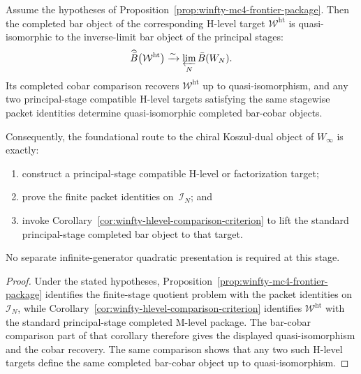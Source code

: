 \begin{corollary}
\label{cor:winfty-dual-candidate-construction}
Assume the hypotheses of
Proposition~\ref{prop:winfty-mc4-frontier-package}.  Then the completed
bar object of the corresponding H-level target
$\mathcal{W}^{\mathrm{ht}}$ is quasi-isomorphic to the inverse-limit
bar object of the principal stages:
\[
\widehat{\bar B}\bigl(\mathcal{W}^{\mathrm{ht}}\bigr)
\xrightarrow{\sim}
\varprojlim_N \bar B(W_N).
\]
Its completed cobar comparison recovers
$\mathcal{W}^{\mathrm{ht}}$ up to quasi-isomorphism, and any two
principal-stage compatible H-level targets satisfying the same
stagewise packet identities determine quasi-isomorphic completed
bar-cobar objects.

Consequently, the foundational route to the chiral Koszul-dual object
of \texorpdfstring{$W_\infty$}{W_infty} is exactly:
\begin{enumerate}
\item construct a principal-stage compatible H-level or factorization
  target;
\item prove the finite packet identities on~$\mathcal{I}_N$; and
\item invoke
  Corollary~\ref{cor:winfty-hlevel-comparison-criterion} to lift the
  standard principal-stage completed bar object to that target.
\end{enumerate}
No separate infinite-generator quadratic presentation is required at
this stage.
\end{corollary}

\begin{proof}
Under the stated hypotheses,
Proposition~\ref{prop:winfty-mc4-frontier-package} identifies the
finite-stage quotient problem with the packet identities on
$\mathcal{I}_N$, while
Corollary~\ref{cor:winfty-hlevel-comparison-criterion} identifies
$\mathcal{W}^{\mathrm{ht}}$ with the standard principal-stage completed
M-level package.  The bar-cobar comparison part of that corollary
therefore gives the displayed quasi-isomorphism and the cobar recovery.
The same comparison shows that any two such H-level targets define the
same completed bar-cobar object up to quasi-isomorphism.
\end{proof}

